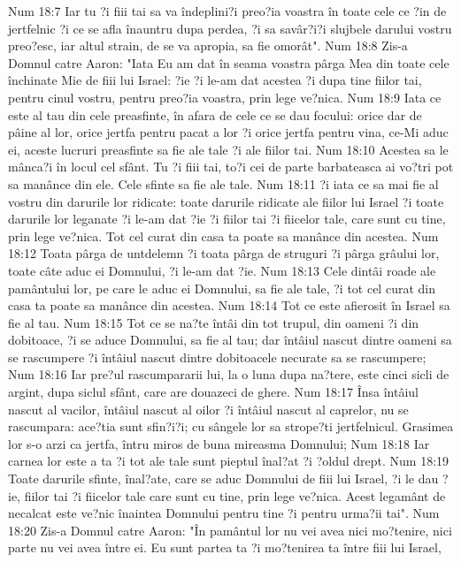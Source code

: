Num 18:7  Iar tu ?i fiii tai sa va îndeplini?i preo?ia voastra în toate cele ce ?in de jertfelnic ?i ce se afla înauntru dupa perdea, ?i sa savâr?i?i slujbele darului vostru preo?esc, iar altul strain, de se va apropia, sa fie omorât".
Num 18:8  Zis-a Domnul catre Aaron: "Iata Eu am dat în seama voastra pârga Mea din toate cele închinate Mie de fiii lui Israel: ?ie ?i le-am dat acestea ?i dupa tine fiilor tai, pentru cinul vostru, pentru preo?ia voastra, prin lege ve?nica.
Num 18:9  Iata ce este al tau din cele preasfinte, în afara de cele ce se dau focului: orice dar de pâine al lor, orice jertfa pentru pacat a lor ?i orice jertfa pentru vina, ce-Mi aduc ei, aceste lucruri preasfinte sa fie ale tale ?i ale fiilor tai.
Num 18:10  Acestea sa le mânca?i în locul cel sfânt. Tu ?i fiii tai, to?i cei de parte barbateasca ai vo?tri pot sa manânce din ele. Cele sfinte sa fie ale tale.
Num 18:11  ?i iata ce sa mai fie al vostru din darurile lor ridicate: toate darurile ridicate ale fiilor lui Israel ?i toate darurile lor leganate ?i le-am dat ?ie ?i fiilor tai ?i fiicelor tale, care sunt cu tine, prin lege ve?nica. Tot cel curat din casa ta poate sa manânce din acestea.
Num 18:12  Toata pârga de untdelemn ?i toata pârga de struguri ?i pârga grâului lor, toate câte aduc ei Domnului, ?i le-am dat ?ie.
Num 18:13  Cele dintâi roade ale pamântului lor, pe care le aduc ei Domnului, sa fie ale tale, ?i tot cel curat din casa ta poate sa manânce din acestea.
Num 18:14  Tot ce este afierosit în Israel sa fie al tau.
Num 18:15  Tot ce se na?te întâi din tot trupul, din oameni ?i din dobitoace, ?i se aduce Domnului, sa fie al tau; dar întâiul nascut dintre oameni sa se rascumpere ?i întâiul nascut dintre dobitoacele necurate sa se rascumpere;
Num 18:16  Iar pre?ul rascumpararii lui, la o luna dupa na?tere, este cinci sicli de argint, dupa siclul sfânt, care are douazeci de ghere.
Num 18:17  Însa întâiul nascut al vacilor, întâiul nascut al oilor ?i întâiul nascut al caprelor, nu se rascumpara: ace?tia sunt sfin?i?i; cu sângele lor sa strope?ti jertfelnicul. Grasimea lor s-o arzi ca jertfa, întru miros de buna mireasma Domnului;
Num 18:18  Iar carnea lor este a ta ?i tot ale tale sunt pieptul înal?at ?i ?oldul drept.
Num 18:19  Toate darurile sfinte, înal?ate, care se aduc Domnului de fiii lui Israel, ?i le dau ?ie, fiilor tai ?i fiicelor tale care sunt cu tine, prin lege ve?nica. Acest legamânt de necalcat este ve?nic înaintea Domnului pentru tine ?i pentru urma?ii tai".
Num 18:20  Zis-a Domnul catre Aaron: "În pamântul lor nu vei avea nici mo?tenire, nici parte nu vei avea între ei. Eu sunt partea ta ?i mo?tenirea ta între fiii lui Israel,
